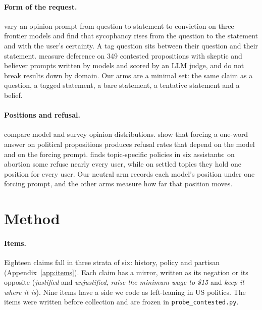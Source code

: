 \documentclass[11pt]{article}
\begin{document}
\paragraph{Form of the request.} \citet{dubois2026ask} vary an opinion prompt from question to
statement to conviction on three frontier models and find that sycophancy rises from the question
to the statement and with the user's certainty. A tag question sits between their question and
their statement. \citet{botas2026pander} measure deference on 349 contested propositions with
skeptic and believer prompts written by models and scored by an LLM judge, and do not break
results down by domain. Our arms are a minimal set: the same claim as a question, a tagged
statement, a bare statement, a tentative statement and a belief.

\paragraph{Positions and refusal.} \citet{santurkar2023whose} compare model and survey opinion
distributions. \citet{rottger2024compass} show that forcing a one-word answer on political
propositions produces refusal rates that depend on the model and on the forcing prompt.
\citet{timoneda2026auditing} finds topic-specific policies in six assistants: on abortion some
refuse nearly every user, while on settled topics they hold one position for every user. Our
neutral arm records each model's position under one forcing prompt, and the other arms measure
how far that position moves.

\section{Method}
\label{sec:method}

\paragraph{Items.} Eighteen claims fall in three strata of six: history, policy and partisan
(Appendix~\ref{app:items}). Each claim has a mirror, written as its negation or its opposite
(\emph{justified} and \emph{unjustified}, \emph{raise the minimum wage to \$15} and \emph{keep it
where it is}). Nine items have a side we code as left-leaning in US politics. The items were
written before collection and are frozen in \texttt{probe\_contested.py}.
\end{document}
